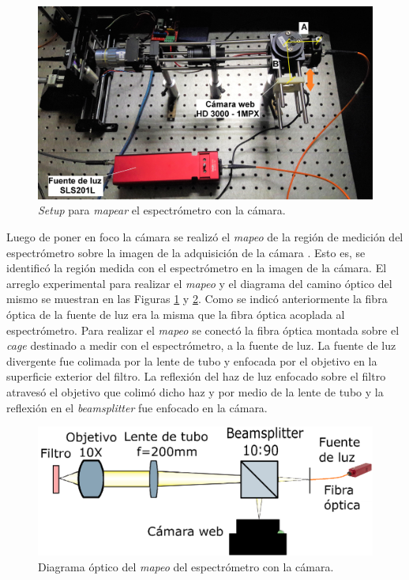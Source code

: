 \begin{figure}[H]
	\centering
	\includegraphics[width=1.0\textwidth]{Figs/microespectrometro/mapespeccam.jpg}
	\caption{\textit{Setup} para \textit{mapear} el espectrómetro con la cámara.}
	\label{fig:modmanualcam}
\end{figure}

Luego de poner en foco la cámara se realizó el \textit{mapeo} de la región de medición del espectrómetro sobre la imagen de la adquisición de la cámara \cite{frise}. Esto es, se identificó la región medida con el espectrómetro en la imagen de la cámara. El arreglo experimental para realizar el \textit{mapeo} y el diagrama del camino óptico del mismo se muestran en las Figuras \ref{fig:modmanualcam} y \ref{fig:caminmapp}. Como se indicó anteriormente la fibra óptica de la fuente de luz era la misma que la fibra óptica acoplada al espectrómetro. Para realizar el \textit{mapeo} se conectó la fibra óptica montada sobre el \textit{cage} destinado a medir con el espectrómetro, a la fuente de luz. La fuente de luz divergente fue colimada por la lente de tubo y enfocada por el objetivo en la superficie exterior del filtro. La reflexión del haz de luz enfocado sobre el filtro atravesó el objetivo que colimó dicho haz y por medio de la lente de tubo y la reflexión en el \textit{beamsplitter} fue enfocado en la cámara.

\begin{figure}[H]
	\centering
	\includegraphics[width=1.0\textwidth]{Figs/microespectrometro/diagopticomapcamspec.png}
	\caption{Diagrama óptico del \textit{mapeo} del espectrómetro con la cámara.}
	\label{fig:caminmapp}
\end{figure}

